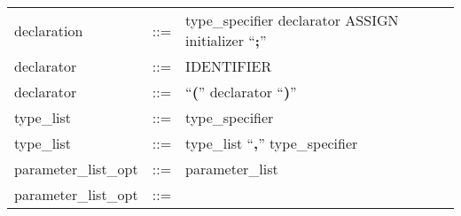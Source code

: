 \begin{longtable}{lrl}
declaration                                & ::= &
  \begin{minipage}[t]{\rulerhs}
    \raggedright
    type\_specifier declarator ASSIGN initializer ``{\bf ;}''
  \end{minipage}                                                             \\
declarator                                 & ::= &
  \begin{minipage}[t]{\rulerhs}
    \raggedright
    IDENTIFIER
  \end{minipage}                                                             \\
declarator                                 & ::= &
  \begin{minipage}[t]{\rulerhs}
    \raggedright
    ``{\bf (}'' declarator ``{\bf )}''
  \end{minipage}                                                             \\
type\_list                                 & ::= &
  \begin{minipage}[t]{\rulerhs}
    \raggedright
    type\_specifier
  \end{minipage}                                                             \\
type\_list                                 & ::= &
  \begin{minipage}[t]{\rulerhs}
    \raggedright
    type\_list ``{\bf ,}'' type\_specifier
  \end{minipage}                                                             \\
parameter\_list\_opt                       & ::= &
  \begin{minipage}[t]{\rulerhs}
    \raggedright
    parameter\_list
  \end{minipage}                                                             \\
parameter\_list\_opt                       & ::= &
  \begin{minipage}[t]{\rulerhs}
    \raggedright
    

\end{minipage}
\end{longtable}
